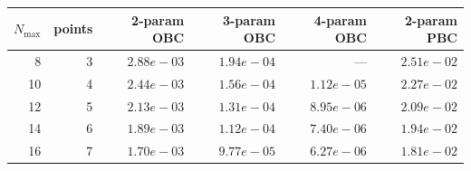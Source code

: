 \begin{tabular}{rrrrrr}
\toprule
$N_{\max}$ & points & 2-param OBC & 3-param OBC & 4-param OBC & 2-param PBC \\
\midrule
8 & 3 & $2.88e-03$ & $1.94e-04$ & --- & $2.51e-02$ \\
10 & 4 & $2.44e-03$ & $1.56e-04$ & $1.12e-05$ & $2.27e-02$ \\
12 & 5 & $2.13e-03$ & $1.31e-04$ & $8.95e-06$ & $2.09e-02$ \\
14 & 6 & $1.89e-03$ & $1.12e-04$ & $7.40e-06$ & $1.94e-02$ \\
16 & 7 & $1.70e-03$ & $9.77e-05$ & $6.27e-06$ & $1.81e-02$ \\
\bottomrule
\end{tabular}
